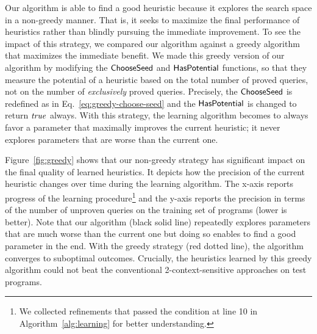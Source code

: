 
Our algorithm is able to find a good heuristic because it explores the
search space in a non-greedy manner.
That is, it seeks to maximize
the final performance of heuristics rather than blindly pursuing the immediate improvement.
To see the impact of this strategy, we compared our algorithm against
a greedy algorithm that maximizes the immediate benefit.
We made this greedy version of our algorithm by modifying the
${\sf ChooseSeed}$ and ${\sf HasPotential}$ functions, so that they measure
the potential of a heuristic based on the total number of proved
queries, not on the number of
{\em exclusively} proved queries. Precisely, the ${\sf ChooseSeed}$ is redefined as in Eq.~\ref{eq:greedy-choose-seed} and the ${\sf HasPotential}$ is changed to return ${\it true}$ always.
With this strategy, the learning algorithm becomes to always favor
a parameter that maximally improves the current heuristic; it never
explores parameters that are worse than the current one.

Figure~\ref{fig:greedy} shows that our non-greedy strategy has
significant impact on the final quality of learned heuristics.
It depicts how the precision of the current
heuristic changes over time during the learning
algorithm.  The x-axis reports progress of the learning procedure\footnote{We collected refinements that passed the condition at line 10 in Algorithm~\ref{alg:learning} for better understanding.} and
the y-axis reports the precision in terms of the number of unproven
queries on the training set of programs (lower is better). Note that
our algorithm (black solid line) repeatedly explores parameters that
are much worse than the current one but doing so enables to find a good
parameter in the end. With the greedy strategy (red dotted line), the
algorithm converges to suboptimal outcomes. Crucially, the heuristics
learned by this greedy algorithm could not beat the conventional
2-context-sensitive approaches on test programs.

